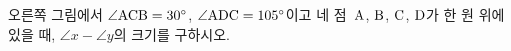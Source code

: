 \noindent\begin{minipage}[t]{0.58\linewidth}\vspace{0pt}\raggedright 오른쪽 그림에서 $\angle\mathrm{ACB}=30^\circ$, $\angle\mathrm{ADC}=105^\circ$이고 네 점~$\mathrm{A}$, $\mathrm{B}$, $\mathrm{C}$, $\mathrm{D}$가 한 원 위에 있을 때, $\angle x-\angle y$의 크기를 구하시오.\end{minipage}\hfill\begin{minipage}[t]{0.4\linewidth}\vspace{0pt}\centering \resizebox{\ifdim\width>\linewidth\linewidth\else\width\fi}{!}{}\end{minipage}\par
